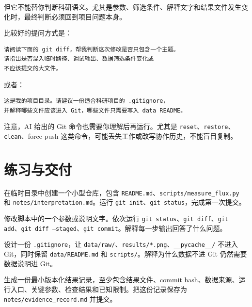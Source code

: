 但它不能替你判断科研语义。尤其是参数、筛选条件、解释文字和结果文件发生变化时，最终判断必须回到项目问题本身。

比较好的提问方式是：

\begin{lstlisting}[style=terminal]
请阅读下面的 git diff，帮我判断这次修改是否只包含一个主题。
请指出是否混入临时路径、调试输出、数据筛选条件变化或
不应该提交的大文件。
\end{lstlisting}

或者：

\begin{lstlisting}[style=terminal]
这是我的项目目录。请建议一份适合科研项目的 .gitignore，
并解释哪些文件应该进入 Git，哪些文件只需要写入 data README。
\end{lstlisting}

注意，AI 给出的 Git 命令也需要你理解后再运行。尤其是 \texttt{reset}、\texttt{restore}、\texttt{clean}、force push 这类命令，可能丢失工作或改写协作历史，不能盲目复制。

\section{练习与交付}

\begin{exercisebox}[基础练习]
在临时目录中创建一个小型仓库，包含 \texttt{README.md}、\texttt{scripts/measure\_flux.py} 和 \texttt{notes/interpretation.md}。运行 \texttt{git init}、\texttt{git status}，完成第一次提交。
\end{exercisebox}

\begin{exercisebox}[过程练习]
修改脚本中的一个参数或说明文字。依次运行 \texttt{git status}、\texttt{git diff}、\texttt{git add}、\texttt{git diff --staged}、\texttt{git commit}。解释每一步输出回答了什么问题。
\end{exercisebox}

\begin{exercisebox}[诊断练习]
设计一份 \texttt{.gitignore}，让 \texttt{data/raw/}、\texttt{results/*.png}、\texttt{\_\_pycache\_\_/} 不进入 Git，同时保留 \texttt{data/README.md} 和 \texttt{scripts/}。解释为什么数据不进 Git 仍然需要数据说明进 Git。
\end{exercisebox}

\begin{exercisebox}[交付练习]
生成一份最小版本化结果记录，至少包含结果文件、commit hash、数据来源、运行入口、关键参数、检查结果和已知限制。把这份记录保存为 \texttt{notes/evidence\_record.md} 并提交。
\end{exercisebox}

